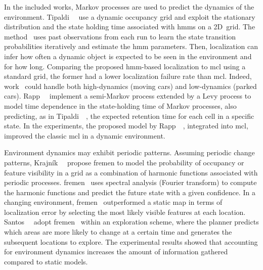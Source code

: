 In the included works, Markov processes are used to predict
the dynamics of the environment.
Tipaldi~\etal~\cite{tipaldi:ijrr:2013} use a dynamic occupancy grid and
exploit the stationary distribution and the state holding time
associated with \glspl{hmm} on a 2D~grid.
The method~\cite{tipaldi:ijrr:2013} uses past observations from each run
to learn the state transition probabilities iteratively and
estimate the \gls{hmm} parameters. Then, localization can infer how often a
dynamic object is expected to be seen in the environment and for how long.
Comparing the proposed \gls{hmm}-based localization to \gls{mcl} using a
standard grid, the former had a lower localization failure rate than \gls{mcl}.
Indeed, work~\cite{tipaldi:ijrr:2013} could handle both high-dynamics
(moving cars) and low-dynamics (parked cars).
Rapp~\etal~\cite{rapp:itsc:2015} implement a semi-Markov process extended by a
Levy process to model time dependence in the state-holding time of Markov
processes, also predicting, as in Tipaldi~\etal~\cite{tipaldi:ijrr:2013},
the expected retention time for each cell in a specific state.
In the experiments, the proposed model by Rapp~\etal~\cite{rapp:itsc:2015},
integrated into \gls{mcl}, improved the classic \gls{mcl} in a dynamic environment.

Environment dynamics may exhibit periodic patterns.
Assuming periodic change patterns, Krajník~\etal~\cite{krajnik:tro:2017}
propose \gls{fremen} to model the probability of occupancy or feature visibility
in a grid as a combination of harmonic functions associated with periodic
processes. \gls{fremen}~\cite{krajnik:tro:2017} uses spectral analysis
(Fourier transform) to compute the harmonic functions and predict
the future state with a given confidence. In a changing environment,
\gls{fremen}~\cite{krajnik:tro:2017} outperformed a static map in terms of
localization error by selecting the most likely visible features at each location.
Santos~\etal~\cite{santos:ral:2016} adopt \gls{fremen}~\cite{krajnik:tro:2017}
within an exploration scheme, where the planner predicts which areas
are more likely to change at a certain time and
generates the subsequent locations to explore.
The experimental results showed that accounting for environment dynamics
increases the amount of information gathered compared to static models.

